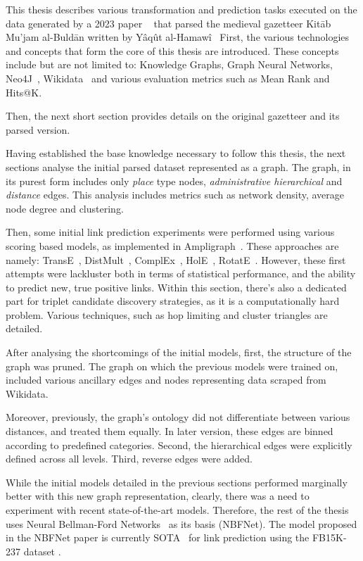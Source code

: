 This thesis describes various transformation and prediction tasks executed on the data generated by a 2023 paper ~\cite{YaqutRB} that parsed the medieval gazetteer Kitāb Mu'jam al-Buldān written by Yâqût al-Hamawî~\cite{Yaqut}
First, the various technologies and concepts that form the core of this thesis are introduced.
These concepts include but are not limited to: Knowledge Graphs, Graph Neural Networks, Neo4J~\cite{Neo4j}, Wikidata~\cite{Wikidata} and various
evaluation metrics such as Mean Rank and Hits@K.

Then, the next short section provides details on the original gazetteer and its parsed version.

Having established the base knowledge necessary to follow this thesis, the next sections analyse the initial parsed dataset represented as a graph.
The graph, in its purest form includes only \textit{place} type nodes,  \textit{administrative hierarchical} and \textit{distance} edges.
This analysis includes metrics such as network density, average node degree and clustering.

Then, some initial link prediction experiments were performed using various scoring based models, as implemented in Ampligraph~\cite{ampligraph}.
These approaches are namely: TransE~\cite{TransE}, DistMult~\cite{DistMult}, ComplEx~\cite{ComplEx}, HolE~\cite{HolE}, RotatE~\cite{RotatE}.
However, these first attempts were lackluster  both in terms of statistical performance, and the ability to predict new, true positive links.
Within this section, there's also a dedicated part for triplet candidate discovery strategies, as it is a computationally hard problem.
Various techniques, such as hop limiting and cluster triangles are detailed.

After analysing the shortcomings of the initial models, first, the structure of the graph was pruned.
The graph on which the previous models were trained on, included various ancillary edges and nodes representing data scraped from Wikidata.

Moreover, previously, the graph's ontology did not differentiate between various distances, and treated them equally.
In later version, these edges are binned according to predefined categories.
Second, the hierarchical edges were explicitly defined across all levels.
Third, reverse edges were added.

While the initial models detailed in the previous sections performed marginally better with this new graph representation,
clearly, there was a need to experiment with recent state-of-the-art models.
Therefore, the rest of the thesis uses Neural Bellman-Ford Networks~\cite{NBFNet} as its basis (NBFNet).
The model proposed in the NBFNet paper is currently SOTA~\cite{NBFNetSota} for link prediction using the FB15K-237 dataset .

